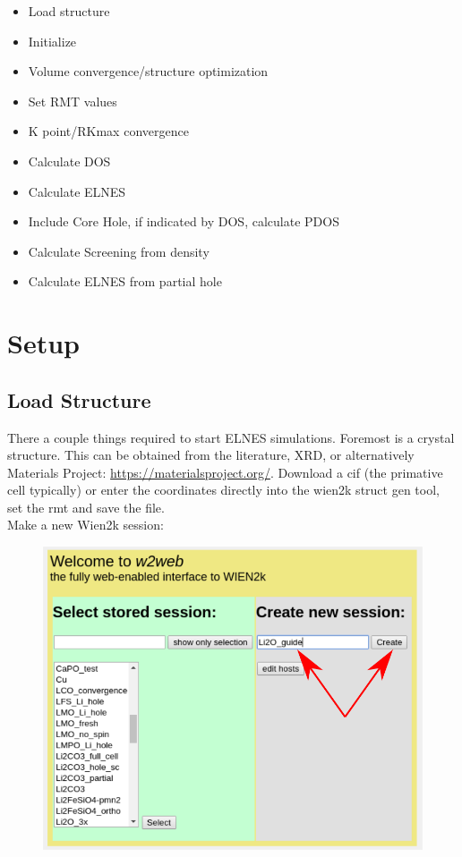 \documentclass[12pt]{article}
\begin{document}
\begin{itemize}
	\item Load structure
	\item Initialize
	\item Volume convergence/structure optimization
	\item Set RMT values
	\item K point/RKmax convergence
	\item Calculate DOS
	\item Calculate ELNES
	\item Include Core Hole, if indicated by DOS, calculate PDOS
	\item Calculate Screening from density
	\item Calculate ELNES from partial hole
\end{itemize}


\section{Setup}	

\subsection{Load Structure}
There a couple things required to start ELNES simulations.  Foremost is a crystal structure.  This can be obtained from the literature, XRD, or alternatively Materials Project: \url{https://materialsproject.org/}.  Download a cif (the primative cell typically) or enter the coordinates directly into the wien2k struct gen tool, set the rmt and save the file.  \\

Make a new Wien2k session: 
\begin{figure}[H]
\includegraphics[scale=0.3]{./images/new_session.png}
\end{figure}
\end{document}
